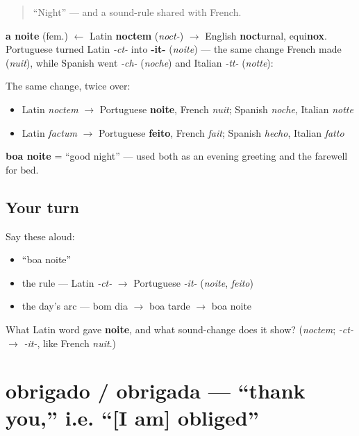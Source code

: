 \begin{quote}
\textquotedblleft{}Night\textquotedblright{} — and a sound-rule shared with French.
\end{quote}

\begin{cousinweb}
\textbf{a noite} (fem.) $\leftarrow$ Latin \textbf{noctem} (\emph{noct-}) $\to$ English \textbf{noct}urnal, equi\textbf{nox}. Portuguese turned Latin \emph{-ct-} into \textbf{-it-} (\emph{noite}) — the same change French made (\emph{nuit}), while Spanish went \emph{-ch-} (\emph{noche}) and Italian \emph{-tt-} (\emph{notte}):

The same change, twice over:

\begin{itemize}
\raggedright
  \item Latin \emph{noctem} $\to$ Portuguese \textbf{noite}, French \emph{nuit}; Spanish \emph{noche}, Italian \emph{notte}
  \item Latin \emph{factum} $\to$ Portuguese \textbf{feito}, French \emph{fait}; Spanish \emph{hecho}, Italian \emph{fatto}
\end{itemize}

\textbf{boa noite} = \textquotedblleft{}good night\textquotedblright{} — used both as an evening greeting and the farewell for bed.
\end{cousinweb}

\subsection*{Your turn}
Say these aloud:

\begin{itemize}
\raggedright
  \item \textquotedblleft{}boa noite\textquotedblright{}
  \item the rule — Latin \emph{-ct-} $\to$ Portuguese \emph{-it-} (\emph{noite}, \emph{feito})
  \item the day's arc — bom dia $\to$ boa tarde $\to$ boa noite
\end{itemize}

\begin{tcolorbox}[breakable,colback=teal!4,colframe=teal!35!black,title={Before you move on}]
What Latin word gave \textbf{noite}, and what sound-change does it show? (\emph{noctem}; \emph{-ct-} $\to$ \emph{-it-}, like French \emph{nuit}.)
\end{tcolorbox}
\section[obrigado / obrigada]{obrigado / obrigada — \textquotedblleft{}thank you,\textquotedblright{} i.e. \textquotedblleft{}{[}I am{]} obliged\textquotedblright{}}

